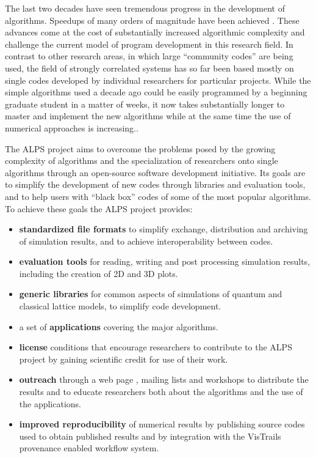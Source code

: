 \documentclass[12pt]{iopart}
\begin{document}
The last two decades have seen tremendous progress in the development of
algorithms.  Speedups of many orders of magnitude have been 
achieved \cite{Evertz03,Troyer03,White1992,Schollwock2005,vidal1,vidal2,Daley2004,White2004,Rubtsov04,Rubtsov05,Werner06,Werner06Kondo, Gull08_ctaux}. These
advances come at the cost of substantially increased algorithmic
complexity and challenge the current model of program development in
this research field. In contrast to other research areas, in which
large ``community codes'' are being used, the field of strongly
correlated systems has so far been based mostly on single codes developed by
individual researchers for particular projects. While the simple
algorithms used a decade ago could be easily programmed by a beginning
graduate student in a matter of weeks, it now takes substantially
longer to master and implement the new algorithms while at the same time the use of numerical approaches is increasing..  

The ALPS project aims to
overcome the problems posed by the growing complexity of algorithms
and the specialization of researchers onto single algorithms through
an open-source software development initiative. Its goals are to simplify the development of new codes through libraries and evaluation tools, and to help users with ``black box'' codes of some of the most popular algorithms. To achieve these goals the ALPS project provides:
\begin{itemize}
\item {\bf standardized file formats} to simplify exchange,
distribution and archiving of simulation results, and to achieve
interoperability between codes.

\item {\bf evaluation tools} for reading, writing and post processing simulation results, including the creation of 2D and 3D plots.

\item {\bf generic libraries} for common aspects of
simulations of quantum and classical lattice models, to simplify code
development.
\item a set of {\bf applications} covering the major algorithms.
\item{\bf license} conditions \cite{librarylicense,applicationlicense} that encourage researchers to contribute
to the ALPS project by gaining scientific credit for use of their
work.
\item {\bf outreach} through a web page \cite{alps}, mailing lists and
workshops to distribute the results and to educate researchers both
about the algorithms and the use of the applications.
\item {\bf improved reproducibility} of numerical results by
publishing source codes used to obtain published results and by integration with the VisTrails \cite{vistrails} provenance enabled workflow system.
\end{itemize}
\end{document}
